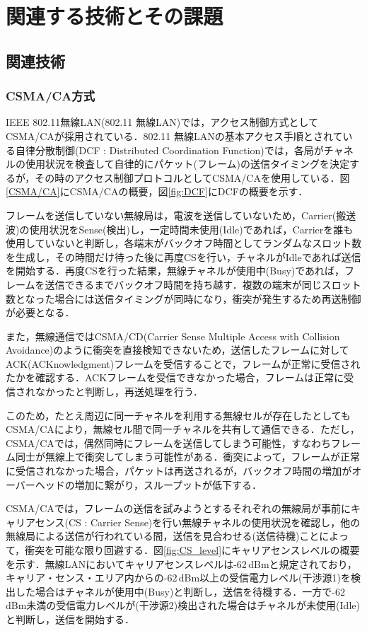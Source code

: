 \documentclass[a4paper,10pt]{ltjsarticle}
\begin{document}
\section{関連する技術とその課題}
\subsection{関連技術}
\subsubsection{CSMA/CA方式}


IEEE 802.11無線LAN(802.11 無線LAN)では，アクセス制御方式としてCSMA/CAが採用されている．802.11 無線LANの基本アクセス手順とされている自律分散制御(DCF : Distributed Coordination Function)では，各局がチャネルの使用状況を検査して自律的にパケット(フレーム)の送信タイミングを決定するが，その時のアクセス制御プロトコルとしてCSMA/CAを使用している．図\ref{CSMA/CA}にCSMA/CAの概要，図\ref{fig:DCF}にDCFの概要を示す．

フレームを送信していない無線局は，電波を送信していないため，Carrier(搬送波)の使用状況をSense(検出)し，一定時間未使用(Idle)であれば，Carrierを誰も使用していないと判断し，各端末がバックオフ時間としてランダムなスロット数を生成し，その時間だけ待った後に再度CSを行い，チャネルがIdleであれば送信を開始する．再度CSを行った結果，無線チャネルが使用中(Busy)であれば，フレームを送信できるまでバックオフ時間を持ち越す．複数の端末が同じスロット数となった場合には送信タイミングが同時になり，衝突が発生するため再送制御が必要となる．

また，無線通信ではCSMA/CD(Carrier Sense Multiple Access with Collision Avoidance)のように衝突を直接検知できないため，送信したフレームに対してACK(ACKnowledgment)フレームを受信することで，フレームが正常に受信されたかを確認する．ACKフレームを受信できなかった場合，フレームは正常に受信されなかったと判断し，再送処理を行う．

このため，たとえ周辺に同一チャネルを利用する無線セルが存在したとしてもCSMA/CAにより，無線セル間で同一チャネルを共有して通信できる．ただし，CSMA/CAでは，偶然同時にフレームを送信してしまう可能性，すなわちフレーム同士が無線上で衝突してしまう可能性がある．衝突によって，フレームが正常に受信されなかった場合，パケットは再送されるが，バックオフ時間の増加がオーバーヘッドの増加に繋がり，スループットが低下する．

CSMA/CAでは，フレームの送信を試みようとするそれぞれの無線局が事前にキャリアセンス(CS : Carrier Sense)を行い無線チャネルの使用状況を確認し，他の無線局による送信が行われている間，送信を見合わせる(送信待機)ことによって，衝突を可能な限り回避する．図\ref{fig:CS_level}にキャリアセンスレベルの概要を示す．無線LANにおいてキャリアセンスレベルは-62\,dBmと規定されており，キャリア・センス・エリア内からの-62\,dBm以上の受信電力レベル(干渉源1)を検出した場合はチャネルが使用中(Busy)と判断し，送信を待機する．一方で-62\,dBm未満の受信電力レベルが(干渉源2)検出された場合はチャネルが未使用(Idle)と判断し，送信を開始する．
\end{document}
